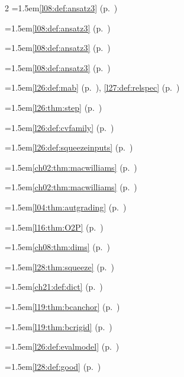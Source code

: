 \begin{multicols}{2}
\hangindent=1.5em\quad \ref{l08:def:ansatz3} (p.~\pageref{l08:def:ansatz3})\par
\hangindent=1.5em\quad \ref{l08:def:ansatz3} (p.~\pageref{l08:def:ansatz3})\par
\hangindent=1.5em\quad \ref{l08:def:ansatz3} (p.~\pageref{l08:def:ansatz3})\par
\hangindent=1.5em\quad \ref{l08:def:ansatz3} (p.~\pageref{l08:def:ansatz3})\par
\hangindent=1.5em\quad \ref{l26:def:mab} (p.~\pageref{l26:def:mab}), \ref{l27:def:relspec} (p.~\pageref{l27:def:relspec})\par
\hangindent=1.5em\quad \ref{l26:thm:step} (p.~\pageref{l26:thm:step})\par
\hangindent=1.5em\quad \ref{l26:def:cvfamily} (p.~\pageref{l26:def:cvfamily})\par
\hangindent=1.5em\quad \ref{l26:def:squeezeinputs} (p.~\pageref{l26:def:squeezeinputs})\par
\hangindent=1.5em\quad \ref{ch02:thm:macwilliams} (p.~\pageref{ch02:thm:macwilliams})\par
\hangindent=1.5em\quad \ref{ch02:thm:macwilliams} (p.~\pageref{ch02:thm:macwilliams})\par
\hangindent=1.5em\quad \ref{l04:thm:autgrading} (p.~\pageref{l04:thm:autgrading})\par
\hangindent=1.5em\quad \ref{l16:thm:O2P} (p.~\pageref{l16:thm:O2P})\par
\hangindent=1.5em\quad \ref{ch08:thm:dims} (p.~\pageref{ch08:thm:dims})\par
\hangindent=1.5em\quad \ref{l28:thm:squeeze} (p.~\pageref{l28:thm:squeeze})\par
\hangindent=1.5em\quad \ref{ch21:def:dict} (p.~\pageref{ch21:def:dict})\par
\hangindent=1.5em\quad \ref{l19:thm:bcanchor} (p.~\pageref{l19:thm:bcanchor})\par
\hangindent=1.5em\quad \ref{l19:thm:bcrigid} (p.~\pageref{l19:thm:bcrigid})\par
\hangindent=1.5em\quad \ref{l26:def:evalmodel} (p.~\pageref{l26:def:evalmodel})\par
\hangindent=1.5em\quad \ref{l28:def:good} (p.~\pageref{l28:def:good})\par

\end{multicols}
